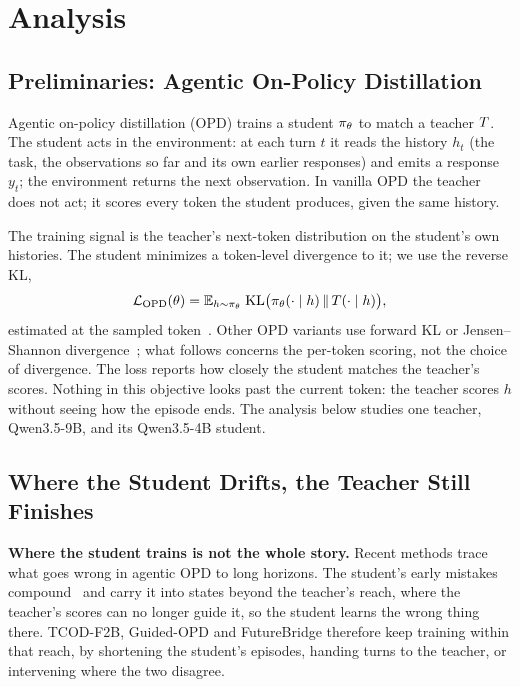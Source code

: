 \section{Analysis}
\label{sec:gap}\label{sec:analysis}\label{sec:setup}\label{sec:setup-objective}\label{sec:setup-taxonomy}%
\label{sec:syndrome}\label{sec:anatomy}\label{sec:anatomy-force}\label{sec:anatomy-carrierchannel}\label{sec:anatomy-keystone}\label{sec:anatomy-lock}\label{sec:gap-general}

\subsection{Preliminaries: Agentic On-Policy Distillation}
\label{sec:prelim}

Agentic on-policy distillation (OPD) trains a student $\pi_\theta$ to match a teacher $T$. The student acts in the environment: at each turn $t$ it reads the history $h_t$ (the task, the observations so far and its own earlier responses) and emits a response $y_t$; the environment returns the next observation. In vanilla OPD the teacher does not act; it scores every token the student produces, given the same history.

The training signal is the teacher's next-token distribution on the student's own histories. The student minimizes a token-level divergence to it; we use the reverse KL,
\begin{equation}
\label{eq:opd}
\mathcal{L}_{\mathrm{OPD}}(\theta)=
\mathbb{E}_{h\sim\pi_\theta}\;
\mathrm{KL}\big(\pi_\theta(\cdot\mid h)\,\|\,T(\cdot\mid h)\big),
\end{equation}
estimated at the sampled token~\citep{mimo2026,li2026bestval}. Other OPD variants use forward KL or Jensen--Shannon divergence~\citep{sdft2026,sdpo2026}; what follows concerns the per-token scoring, not the choice of divergence. The loss reports how closely the student matches the teacher's scores. Nothing in this objective looks past the current token: the teacher scores $h$ without seeing how the episode ends.
The analysis below studies one teacher, Qwen3.5-9B, and its Qwen3.5-4B student.

\subsection{Where the Student Drifts, the Teacher Still Finishes}
\label{sec:takeover}\label{sec:loss-success}

\textbf{Where the student trains is not the whole story.} Recent methods trace what goes wrong in agentic OPD to long horizons. The student's early mistakes compound~\citep{dagger2011} and carry it into states beyond the teacher's reach, where the teacher's scores can no longer guide it, so the student learns the wrong thing there. TCOD-F2B, Guided-OPD and FutureBridge therefore keep training within that reach, by shortening the student's episodes, handing turns to the teacher, or intervening where the two disagree.

